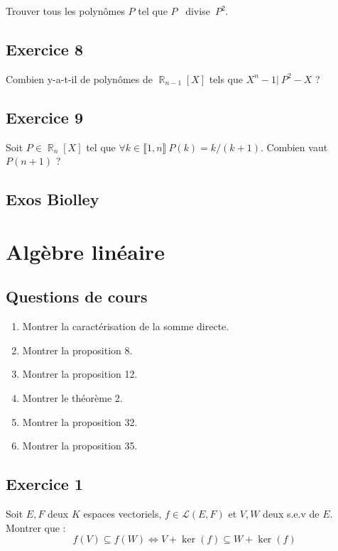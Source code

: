 \documentclass{article}
\DeclareMathOperator{\R}{\mathbb{R}}
\newcommand{\n}{\llbracket 1, n \rrbracket}
\begin{document}
Trouver tous les polynômes $P$ tel que $P$  divise $P^2$. 

\subsection*{Exercice 8} 

Combien y-a-t-il de polynômes de $\R_{n-1}[X]$ tels que $X^n -1  | \ P^2 - X$ ? 

\subsection*{Exercice 9} 

Soit $P \in \R_n[X]$ tel que $\forall k \in \n \ P(k) = k/(k+1)$. Combien vaut $P(n+1)$ ? 

\subsection*{Exos Biolley} 

\clearpage

\section{Algèbre linéaire} 

\subsection*{Questions de cours} 

\begin{enumerate}
    \item Montrer la caractérisation de la somme directe. 
    \item Montrer la proposition 8. 
    \item Montrer la proposition 12. 
    \item Montrer le théorème 2. 
    \item Montrer la proposition 32. 
    \item Montrer la proposition 35. 
\end{enumerate}
\subsection*{Exercice 1} 

Soit $E, F$ deux $K$ espaces vectoriels, $f \in \mathcal{L}(E, F)$ et $V, W$ deux s.e.v de $E$. Montrer que : $$f(V) \subseteq f(W) \Longleftrightarrow V + \ker(f) \subseteq W + \ker(f)$$  
\end{document}
